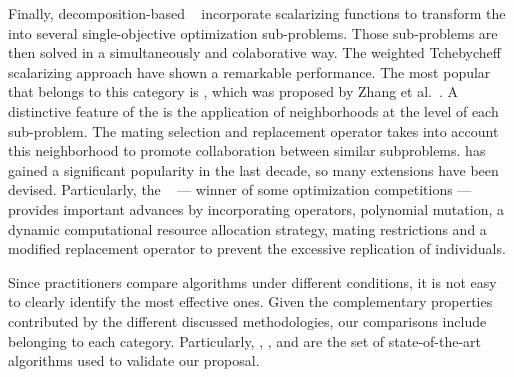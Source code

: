 Finally, decomposition-based \MOEAS{}~\cite{ishibuchi1998multi} incorporate scalarizing functions to transform the \MOP{} 
into several single-objective optimization sub-problems.
%
Those sub-problems are then solved in a simultaneously and colaborative way.
%
The weighted Tchebycheff scalarizing approach have shown a remarkable performance.
%
The most popular \MOEA{} that belongs to this category is \MOEAD{}, which was proposed by Zhang et al.~\cite{zhang2007moea}.
%
A distinctive feature of the \MOEAD{} is the application of neighborhoods at the level of each sub-problem.
%
The mating selection and replacement operator takes into account this neighborhood to promote collaboration
between similar subproblems.
%
\MOEAD{} has gained a significant popularity in the last decade, so many extensions have been devised.
%
Particularly, the \MOEADDE{}~\cite{li2009multiobjective} --- winner of some optimization competitions --- provides
important advances by incorporating \DE{} operators, polynomial mutation, a dynamic computational resource allocation strategy, 
mating restrictions and a modified replacement operator to prevent the excessive replication of individuals. 

Since practitioners compare algorithms under different conditions, it is not easy to clearly identify the most effective ones.
%
Given the complementary properties contributed by the different discussed methodologies, our comparisons include \MOEAS{} belonging
to each category. Particularly, \NSGAII{}, \NSGAIII{}, \RMOEA{} and \MOEADDE{} are the set of state-of-the-art algorithms used
to validate our proposal.
